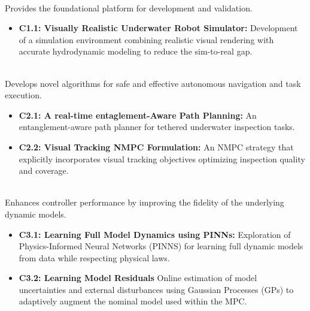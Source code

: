 \begin{description}[leftmargin=1cm, style=unboxed, font=\normalfont] %

    \item[\textcolor{blue}{\textbf{[C1] Simulation }}] \hfill \\
        Provides the foundational platform for development and validation.
        \begin{itemize}[leftmargin=0.5cm, itemsep=0pt]
            \item \textbf{C1.1: Visually Realistic Underwater Robot Simulator:} Development of a simulation environment combining realistic visual rendering with accurate hydrodynamic modeling to reduce the sim-to-real gap.
        \end{itemize}

    \item[\textcolor{blue}{\textbf{[C2] Control and Planning}}] \hfill \\
        Develops novel algorithms for safe and effective autonomous navigation and task execution.
        \begin{itemize}[leftmargin=0.5cm, itemsep=0pt]
            \item \textbf{C2.1: A real-time entaglement-Aware Path Planning:}  An entanglement-aware path planner for tethered underwater inspection tasks.
            \item \textbf{C2.2: Visual Tracking  \ac{NMPC} Formulation:} An \ac{NMPC} strategy that explicitly incorporates visual tracking objectives optimizing  inspection quality and coverage.
        \end{itemize}

    \item[\textcolor{blue}{\textbf{[C3] Model Learning}}] \hfill \\
        Enhances controller performance by improving the fidelity of the underlying dynamic models.
         \begin{itemize}[leftmargin=0.5cm, itemsep=0pt]
            \item \textbf{C3.1: Learning Full Model Dynamics using PINNs:} Exploration of Physics-Informed Neural Networks (PINNS) for learning full dynamic models from data while respecting physical laws.
            \item \textbf{C3.2: Learning Model Residuals} Online estimation of model uncertainties and external disturbances using Gaussian Processes (GPs) to adaptively augment the nominal model used within the \ac{MPC}.
        \end{itemize}
\end{description}


